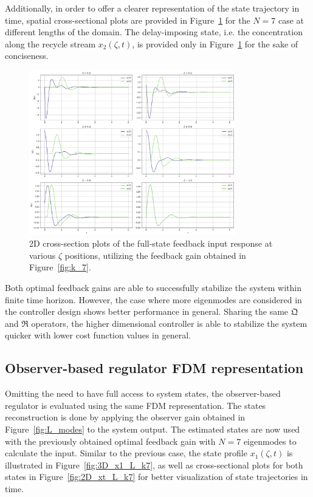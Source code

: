 Additionally, in order to offer a clearer representation of the state trajectory in time, spatial cross-sectional plots are provided in Figure~\ref{fig:2D_xt_k7} for the $N=7$ case at different lengths of the domain. The delay-imposing state, i.e. the concentration along the recycle stream $x_2(\zeta,t)$, is provided only in Figure~\ref{fig:2D_xt_k7} for the sake of conciseness.

\begin{figure}[!htbp]
    \centering
    \includegraphics[width=0.8\textwidth]{Figures/2D_xt_k7.png}
    \caption{2D cross-section plots of the full-state feedback input response at various $\zeta$ positions, utilizing the feedback gain obtained in Figure~\ref{fig:k_7}.}
    \label{fig:2D_xt_k7}
\end{figure}

Both optimal feedback gains are able to successfully stabilize the system within finite time horizon. However, the case where more eigenmodes are considered in the controller design shows better performance in general. Sharing the same $\mathfrak{Q}$ and $\mathfrak{R}$ operators, the higher dimensional controller is able to stabilize the system quicker with lower cost function values in general.

\subsection{Observer-based regulator FDM representation}

Omitting the need to have full access to system states, the observer-based regulator is evaluated using the same FDM representation. The states reconstruction is done by applying the observer gain obtained in Figure~\ref{fig:L_modes} to the system output. The estimated states are now used with the previously obtained optimal feedback gain with $N=7$ eigenmodes to calculate the input. Similar to the previous case, the state profile $x_1(\zeta,t)$ is illustrated in Figure~\ref{fig:3D_x1_L_k7}, as well as cross-sectional plots for both states in Figure~\ref{fig:2D_xt_L_k7} for better visualization of state trajectories in time.

